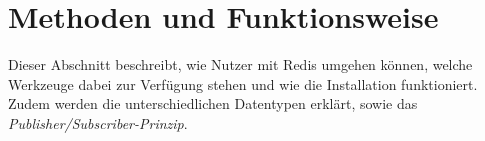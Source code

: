 
\section{Methoden und Funktionsweise}

Dieser Abschnitt beschreibt, wie Nutzer mit \ac{Redis} umgehen können, welche Werkzeuge dabei zur Verfügung stehen und wie die Installation funktioniert. Zudem werden die unterschiedlichen Datentypen erklärt, sowie das \textit{Publisher/Subscriber-Prinzip}.